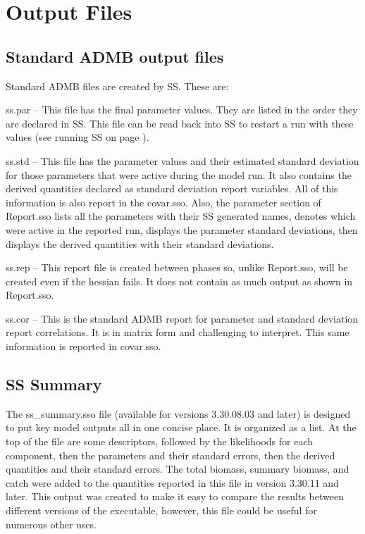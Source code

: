\section{Output Files}
\subsection{Standard ADMB output files}
Standard ADMB files are created by SS. These are:

ss.par – This file has the final parameter values.  They are listed in the order they are declared in SS.  This file can be read back into SS to restart a run with these values (see running SS on page \pageref{sec:RunningSS}).

ss.std – This file has the parameter values and their estimated standard deviation for those parameters that were active during the model run.  It also contains the derived quantities declared as standard deviation report variables.  All of this information is also report in the covar.sso.  Also, the parameter section of Report.sso lists all the parameters with their SS generated names, denotes which were active in the reported run, displays the parameter standard deviations, then displays the derived quantities with their standard deviations.

ss.rep – This report file is created between phases so, unlike Report.sso, will be created even if the hessian fails. It does not contain as much output as shown in Report.sso.

ss.cor – This is the standard ADMB report for parameter and standard deviation report correlations. It is in matrix form and challenging to interpret.  This same information is reported in covar.sso.

\subsection{SS Summary}
The ss\_summary.sso file (available for versions 3.30.08.03 and later) is designed to put key model outputs all in one concise place.  It is organized as a list.  At the top of the file are some descriptors, followed by the likelihoods for each component, then the parameters and their standard errors, then the derived quantities and their standard errors.  The total biomass, summary biomass, and catch were added to the quantities reported in this file in version 3.30.11 and later. This output was created to make it easy to compare the results between different versions of the executable, however, this file could be useful for numerous other uses. 


